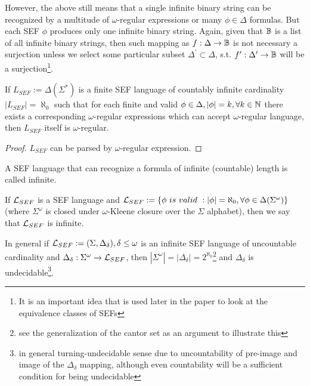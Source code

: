 However, the above still means that a single infinite binary string can be recognized by a multitude of $\omega$-regular expressions or many $\phi \in \Delta$ formulas. But each SEF $\phi$ produces only one infinite binary string. Again, given that $\mathbb{B}$ is a list of all infinite binary strings, then such mapping as $f : \Delta \to \mathbb{B}$ is not necessary a surjection unless we select some particular subset $\Delta^{\prime} \subset \Delta$, s.t. $f^\prime: \Delta^{\prime} \to \mathbb{B}$ will be a surjection\footnote{It is an important idea that is used later in the paper to look at the equivalence classes of SEFs}.

\begin{corollary}
  If $L_{SEF} := \Delta(\Sigma^*)$ is a finite SEF language of countably infinite cardinality $|L_{SEF}| = \aleph_0$ such that for each finite and valid $\phi \in \Delta, |\phi| = k, \forall k \in \mathbb{N}$ there exists a corresponding $\omega$-regular expressions which can accept $\omega$-regular language, then $L_{SEF}$ itself is $\omega$-regular.
\end{corollary}

\begin{proof}$L_{SEF}$ can be parsed by $\omega$-regular expression.\end{proof}

A SEF language that can recognize a formula of infinite (countable) length is called infinite.

\begin{definition}\label{def_ulsef}
  If $\mathcal{L}_{SEF}$ is a SEF language and $\mathcal{L}_{SEF} := \{\phi\ is\ valid\ : |\phi| = \aleph_0, \forall \phi \in \Delta(\Sigma^\omega)\}$ (where $\Sigma^\omega$ is closed under $\omega$-Kleene closure over the $\Sigma$ alphabet), then we say that $\mathcal{L}_{SEF}$ is infinite.
\end{definition}

\begin{lemma}
  In general if $\mathcal{L}_{SEF} := (\Sigma, \Delta_\delta), \delta \leq \omega$ is an infinite SEF language of uncountable cardinality and $\Delta_\delta: \Sigma^\omega \to \mathcal{L}_{SEF}$, then $|\Sigma^\omega| = |\Delta_\delta| = 2^{\aleph_0}$\footnote{see the generalization of the cantor set as an argument to illustrate this} and $\Delta_\delta$ is undecidable\footnote{in general turning-undecidable sense due to uncountability of pre-image and image of the $\Delta_\delta$ mapping, although even countability will be a sufficient condition for being undecidable}.
\end{lemma}

